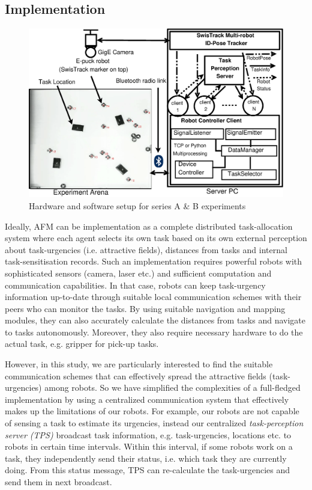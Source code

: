 \documentclass[preprint,12pt]{elsarticle}
\begin{document}
\subsection{Implementation}
\label{afm:impl}
\begin{figure}
\centering
\includegraphics[width=\textwidth, angle=0]
{./images/RIL-Expt-Setup1.eps}
\caption{Hardware and software setup for series A \& B experiments}
\label{fig:RIL-Expt-Setup1} %
\end{figure}
Ideally, AFM can be implementation as a complete distributed task-allocation system where each agent selects its own task based on its own external perception about task-urgencies (i.e. attractive fields),  distances from tasks and internal task-sensitisation records. Such an implementation requires powerful robots with sophisticated sensors (camera, laser etc.) and sufficient computation and communication  capabilities. In that case, robots can keep  task-urgency information up-to-date  through suitable local communication  schemes with their peers who can monitor the tasks. By using suitable navigation and mapping modules, they can also accurately calculate the distances from tasks and navigate to tasks autonomously. Moreover, they also require necessary hardware to do the actual task, e.g. gripper for pick-up tasks.

However, in this study, we are particularly interested to find the suitable communication schemes that can effectively spread the attractive fields (task-urgencies) among robots. So we have simplified the complexities of a full-fledged implementation by using a centralized communication system  that effectively makes up the limitations of our robots.  For example, our robots are not  capable of sensing a task to estimate its urgencies, instead our centralized {\em task-perception server (TPS)} broadcast task information, e.g. task-urgencies, locations etc. to robots in certain time intervals. Within this interval, if some robots work on a task, they independently send their status, i.e. which task they are currently doing. From this status message,  TPS can re-calculate the task-urgencies and send them in next broadcast. 
\end{document}
